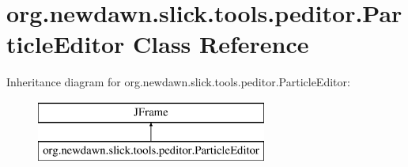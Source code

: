 \hypertarget{classorg_1_1newdawn_1_1slick_1_1tools_1_1peditor_1_1_particle_editor}{}\section{org.\+newdawn.\+slick.\+tools.\+peditor.\+Particle\+Editor Class Reference}
\label{classorg_1_1newdawn_1_1slick_1_1tools_1_1peditor_1_1_particle_editor}
Inheritance diagram for org.\+newdawn.\+slick.\+tools.\+peditor.\+Particle\+Editor\+:\begin{figure}[H]
\begin{center}
\leavevmode
\includegraphics[height=2.000000cm]{classorg_1_1newdawn_1_1slick_1_1tools_1_1peditor_1_1_particle_editor}
\end{center}
\end{figure}
